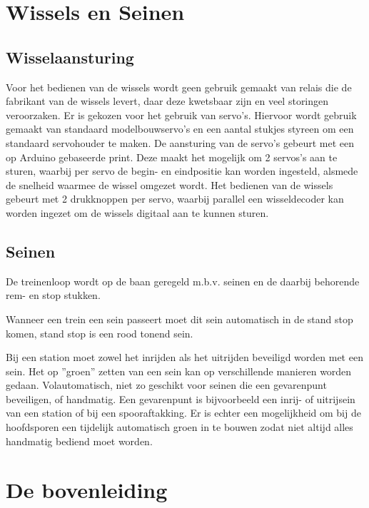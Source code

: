 \documentclass[12pt,a4paper]{report}
\begin{document}
\chapter{Wissels en Seinen}
\label{ch:beveiliging}

\section{Wisselaansturing}
Voor het bedienen van de wissels wordt geen gebruik gemaakt van relais die de fabrikant van de wissels levert, daar deze kwetsbaar zijn en veel storingen veroorzaken. Er is gekozen voor het gebruik van servo's. Hiervoor wordt gebruik gemaakt van standaard modelbouwservo's en een aantal stukjes styreen om een standaard servohouder te maken. De aansturing van de servo's gebeurt met een op Arduino gebaseerde print. Deze maakt het mogelijk om 2 servos's aan te sturen, waarbij per servo de begin- en eindpositie kan worden ingesteld, alsmede de snelheid waarmee de wissel omgezet wordt. Het bedienen van de wissels gebeurt met 2 drukknoppen per servo, waarbij parallel een wisseldecoder kan worden ingezet om de wissels digitaal aan te kunnen sturen.

\section{Seinen}

De treinenloop wordt op de baan geregeld m.b.v. seinen en de daarbij behorende rem- en stop stukken.

Wanneer een trein een sein passeert moet dit sein automatisch in de stand stop komen,
stand stop is een rood tonend sein.

Bij een station moet zowel het inrijden als het uitrijden beveiligd worden met een sein. Het op ''groen'' zetten van een sein kan op verschillende manieren worden gedaan. Volautomatisch, niet zo geschikt voor seinen die een gevarenpunt beveiligen, of handmatig.
Een gevarenpunt is bijvoorbeeld een inrij- of uitrijsein van een station of bij een spooraftakking. Er is echter een mogelijkheid om bij de hoofdsporen een tijdelijk automatisch groen in te bouwen zodat niet altijd alles handmatig bediend moet worden.

\chapter{De bovenleiding}
\label{ch:bovenleiding}
\end{document}
